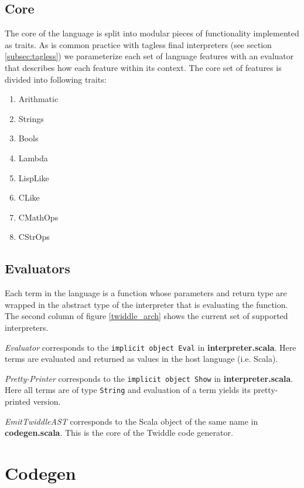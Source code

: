 \documentclass{article}
\begin{document}
\subsection{Core}
The core of the language is split into modular pieces of functionality implemented as traits. As is common practice with tagless final interpreters (see section \ref{subsec:tagless}) we parameterize each set of language features with an evaluator that describes how each feature within its context. The core set of features is divided into following traits:
\begin{enumerate}
	\item Arithmatic
	\item Strings
	\item Bools
	\item Lambda
	\item LispLike
	\item CLike
	\item CMathOps
	\item CStrOps
\end{enumerate}

\subsection{Evaluators}
Each term in the language is a function whose parameters and return type are wrapped in the abstract type of the interpreter that is evaluating the function. The second column of figure \ref{twiddle_arch} shows the current set of supported interpreters.

\textit{Evaluator} corresponds to the \texttt{implicit object Eval} in \textbf{interpreter.scala}. Here terms are evaluated and returned as values in the host language (i.e. Scala).

\textit{Pretty-Printer} corresponds to the \texttt{implicit object Show} in \textbf{interpreter.scala}. Here all terms are of type \texttt{String} and evaluation of a term yields its pretty-printed version.

\textit{EmitTwiddleAST} corresponds to the Scala object of the same name in \textbf{codegen.scala}. This is the core of the Twiddle code generator.

\section{Codegen}
\end{document}
